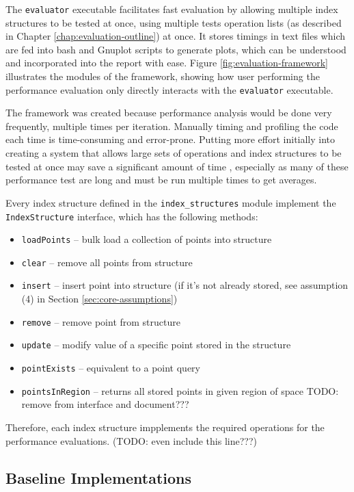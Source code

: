 The \texttt{evaluator} executable facilitates fast evaluation by allowing multiple index structures to be tested at once, using multiple tests operation lists (as described in Chapter \ref{chap:evaluation-outline}) at once. It stores timings in text files which are fed into bash and Gnuplot scripts to generate plots, which can be understood and incorporated into the report with ease. Figure \ref{fig:evaluation-framework} illustrates the modules of the framework, showing how user performing the performance evaluation only directly interacts with the \texttt{evaluator} executable.

The framework was created because performance analysis would be done very frequently, multiple times per iteration. Manually timing and profiling the code each time is time-consuming and error-prone. Putting more effort initially into creating a system that allows large sets of operations and index structures to be tested at once may save a significant amount of time , especially as many of these performance test are long and must be run multiple times to get averages.

Every index structure defined in the \texttt{index\_structures} module implement the \texttt{IndexStructure} interface, which has the following methods:
\begin{itemize}
	\item \texttt{loadPoints} -- bulk load a collection of points into structure
	\item \texttt{clear} -- remove all points from structure
	\item \texttt{insert} -- insert point into structure (if it's not already stored, see assumption (4) in Section \ref{sec:core-assumptions})
	\item \texttt{remove} -- remove point from structure
	\item \texttt{update} -- modify value of a specific point stored in the structure
	\item \texttt{pointExists} -- equivalent to a point query
	\item \texttt{pointsInRegion} -- returns all stored points in given region of space TODO: remove from interface and document???
\end{itemize}
Therefore, each index structure impplements the required operations for the performance evaluations. (TODO: even include this line???)

\subsection{Baseline Implementations}
 

